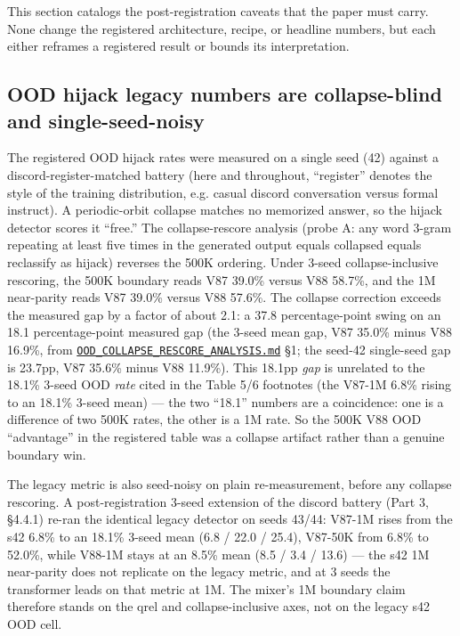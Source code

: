 \documentclass[11pt]{article}
\begin{document}
This section catalogs the post-registration caveats that the paper must carry. None change the registered architecture, recipe, or headline numbers, but each either reframes a registered result or bounds its interpretation.

\subsection{OOD hijack legacy numbers are collapse-blind and single-seed-noisy}

The registered OOD hijack rates were measured on a single seed (42) against a discord-register-matched battery (here and throughout, ``register'' denotes the style of the training distribution, e.g. casual discord conversation versus formal instruct). A periodic-orbit collapse matches no memorized answer, so the hijack detector scores it ``free.'' The collapse-rescore analysis (probe A: any word 3-gram repeating at least five times in the generated output equals collapsed equals reclassify as hijack) reverses the 500K ordering. Under 3-seed collapse-inclusive rescoring, the 500K boundary reads V87 39.0\% versus V88 58.7\%, and the 1M near-parity reads V87 39.0\% versus V88 57.6\%. The collapse correction exceeds the measured gap by a factor of about 2.1: a 37.8 percentage-point swing on an 18.1 percentage-point measured gap (the 3-seed mean gap, V87 35.0\% minus V88 16.9\%, from \href{https://github.com/llaa33219/MicroMixer-4/blob/4bb630413dfa58ef3141291e121ab8c006d03235/OOD_COLLAPSE_RESCORE_ANALYSIS.md}{\texttt{OOD\_COLLAPSE\_RESCORE\_ANALYSIS.md}} \S1; the seed-42 single-seed gap is 23.7pp, V87 35.6\% minus V88 11.9\%). This 18.1pp \emph{gap} is unrelated to the 18.1\% 3-seed OOD \emph{rate} cited in the Table 5/6 \textdagger{} footnotes (the V87-1M 6.8\% rising to an 18.1\% 3-seed mean) --- the two ``18.1'' numbers are a coincidence: one is a difference of two 500K rates, the other is a 1M rate. So the 500K V88 OOD ``advantage'' in the registered table was a collapse artifact rather than a genuine boundary win.

The legacy metric is also seed-noisy on plain re-measurement, before any collapse rescoring. A post-registration 3-seed extension of the discord battery (Part 3, \S4.4.1) re-ran the identical legacy detector on seeds 43/44: V87-1M rises from the s42 6.8\% to an 18.1\% 3-seed mean (6.8 / 22.0 / 25.4), V87-50K from 6.8\% to 52.0\%, while V88-1M stays at an 8.5\% mean (8.5 / 3.4 / 13.6) --- the s42 1M near-parity does not replicate on the legacy metric, and at 3 seeds the transformer leads on that metric at 1M. The mixer's 1M boundary claim therefore stands on the qrel and collapse-inclusive axes, not on the legacy s42 OOD cell.
\end{document}
